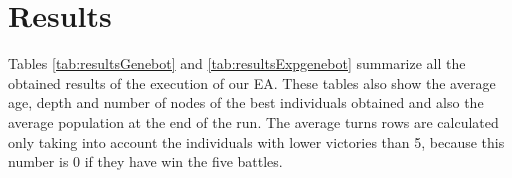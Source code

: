 \section{Results}

Tables \ref{tab:resultsGenebot} and \ref{tab:resultsExpgenebot} summarize all the obtained results of the execution of our EA. These tables also show the average age, depth and number of nodes of the best individuals obtained and also the average population at the end of the run. The average turns rows are calculated only taking into account the individuals with lower victories than 5, because this number is 0 if they have win the five battles.

\newcommand{\SetRowColor}[1]{\noalign{\gdef\RowColorName{#1}}\rowcolor{\RowColorName}}
\newcommand{\mymulticolumn}[3]{\multicolumn{#1}{>{\columncolor{\RowColorName}}#2}{#3}}
\newcommand{\mymultirow}[3]{\multirow{#1}{>{\rowcolor{\RowColorName}}#2}{#3}}

